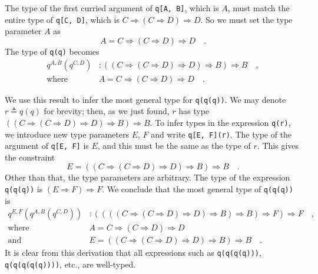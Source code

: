 The type of the first curried argument of \lstinline!q[A, B]!,
which is $A$, must match the entire type of \lstinline!q[C, D]!,
which is $C\Rightarrow\left(C\Rightarrow D\right)\Rightarrow D$.
So we must set the type parameter $A$ as
\[
A=C\Rightarrow\left(C\Rightarrow D\right)\Rightarrow D\quad.
\]
The type of \lstinline!q(q)!
becomes
\begin{align*}
q^{A,B}(q^{C,D}) & :\left(\left(C\Rightarrow\left(C\Rightarrow D\right)\Rightarrow D\right)\Rightarrow B\right)\Rightarrow B\quad,\\
\text{where}\quad & A=C\Rightarrow\left(C\Rightarrow D\right)\Rightarrow D\quad.
\end{align*}

We use this result to infer the most general type for \lstinline!q(q(q))!.
We may denote $r\triangleq q(q)$ for brevity; then, as we just found,
$r$ has type $\left(\left(C\Rightarrow\left(C\Rightarrow D\right)\Rightarrow D\right)\Rightarrow B\right)\Rightarrow B$.
To infer types in the expression \lstinline!q(r)!,
we introduce new type parameters $E$, $F$ and write \lstinline!q[E, F](r)!.
The type of the argument of \lstinline!q[E, F]!
is $E$, and this must be the same as the type of $r$. This gives
the constraint
\[
E=\left(\left(C\Rightarrow\left(C\Rightarrow D\right)\Rightarrow D\right)\Rightarrow B\right)\Rightarrow B\quad.
\]
Other than that, the type parameters are arbitrary. The type of the
expression \lstinline!q(q(q))!
is $\left(E\Rightarrow F\right)\Rightarrow F$. We conclude that the
most general type of \lstinline!q(q(q))!
is
\begin{align*}
q^{E,F}(q^{A,B}(q^{C,D})) & :\left(\left(\left(\left(C\Rightarrow\left(C\Rightarrow D\right)\Rightarrow D\right)\Rightarrow B\right)\Rightarrow B\right)\Rightarrow F\right)\Rightarrow F\quad,\\
\text{where}\quad & A=C\Rightarrow\left(C\Rightarrow D\right)\Rightarrow D\\
\text{and}\quad & E=\left(\left(C\Rightarrow\left(C\Rightarrow D\right)\Rightarrow D\right)\Rightarrow B\right)\Rightarrow B\quad.
\end{align*}
It is clear from this derivation that all expressions such as \lstinline!q(q(q(q)))!,
\lstinline!q(q(q(q(q))))!,
etc., are well-typed.

